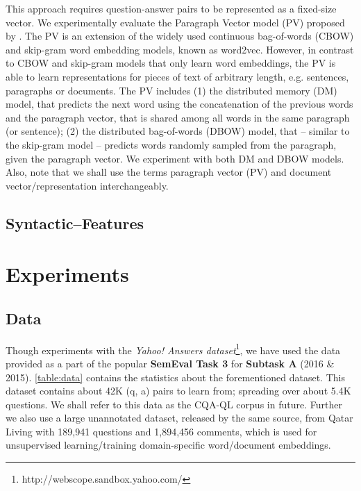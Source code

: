 \documentclass[12pt, a4paper, oneside]{Thesis} %
\newcommand{\mychapter}[2]{
    \setcounter{chapter}{#1}
    \setcounter{section}{0}
    \chapter*{#2}
    \addcontentsline{toc}{chapter}{#2}
    \lhead{\emph{#2}}
}
\begin{document}
This approach requires question-answer pairs to be represented as a fixed-size vector. We experimentally evaluate the Paragraph Vector model (PV) proposed by \cite{le2014distributed}. The PV is an extension of the widely used continuous bag-of-words (CBOW) and skip-gram word embedding models, known as word2vec. However, in contrast to CBOW and skip-gram models that only learn word embeddings, the PV is able to learn representations for pieces of text of arbitrary length, e.g. sentences, paragraphs or documents. The PV includes (1) the distributed memory (DM) model, that predicts the next word using the concatenation of the previous words and the paragraph vector, that is shared among all words in the same paragraph (or sentence); (2) the distributed bag-of-words (DBOW) model, that – similar to the skip-gram model – predicts words randomly sampled from the paragraph, given the paragraph vector. We experiment with both DM and DBOW models. Also, note that we shall use the terms paragraph vector (PV) and document vector/representation interchangeably.

\section{Syntactic--Features}
\label{section:super-features}



\mychapter{4}{Experiments}

\section{Data}

Though \cite{bogdanova2016we} experiments with the \textit{Yahoo! Answers dataset}\footnote{http://webscope.sandbox.yahoo.com/}, we have used the data provided as a part of the popular \textbf{SemEval Task 3} for \textbf{Subtask A} (2016 \& 2015). \autoref{table:data} contains the statistics about the forementioned dataset. This dataset contains about 42K (q, a) pairs to learn from; spreading over about 5.4K questions. We shall refer to this data as the CQA-QL corpus in future. Further we also use a large unannotated dataset, released by the same source, from Qatar Living with 189,941 questions and 1,894,456 comments, which is used for unsupervised learning/training domain-specific word/document embeddings. \\
\end{document}

